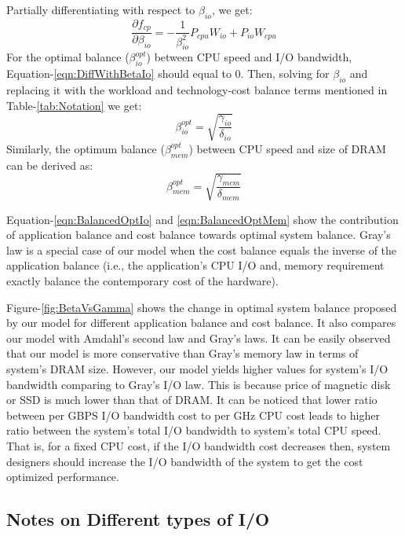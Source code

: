 \documentclass[journal]{IEEEtran}
\begin{document}
Partially differentiating with respect to $\beta_{io}$, we get:
\begin{equation} \label{eqn:DiffWithBetaIo}
\frac{\partial f_{cp}}{\partial \beta_{io}} = -\frac{1}{\beta_{io}^2}P_{cpu}W_{io} + P_{io}W_{cpu}
\end{equation}
For the optimal balance ($\beta_{io}^{opt}$) between CPU speed and I/O bandwidth, Equation-\ref{eqn:DiffWithBetaIo} should equal to $0$. Then,  solving for $\beta_{io}$ and replacing it with the workload and technology-cost balance terms mentioned in Table-\ref{tab:Notation} we get:
\begin{equation} \label{eqn:BalancedOptIo}
\beta^{opt}_{io} = \sqrt{\frac{\gamma_{io}}{\delta_{io}}}
\end{equation}
Similarly, the optimum balance ($\beta_{mem}^{opt}$) between CPU speed and size of DRAM can be derived as: 
\begin{equation} \label{eqn:BalancedOptMem}
\beta^{opt}_{mem} = \sqrt{\frac{\gamma_{mem}}{\delta_{mem}}}
\end{equation}

Equation-\ref{eqn:BalancedOptIo} and \ref{eqn:BalancedOptMem} show the contribution of application balance and cost balance towards  optimal system balance. Gray's law is a special case of our model when the cost balance equals the inverse of the application balance (i.e., the application's CPU  I/O and, memory requirement exactly balance the contemporary cost of the hardware).

Figure-\ref{fig:BetaVsGamma} shows the change in optimal system balance proposed by our model for different application balance and cost balance. It also compares our model with Amdahl's second law and Gray's laws. It can be easily observed that our model is more conservative than Gray's memory law in terms of system's DRAM size. However, our model yields higher values for system's I/O bandwidth comparing to Gray's I/O law. This is because price of magnetic disk or SSD is much lower than that of DRAM. It can be noticed that lower  ratio between per GBPS I/O bandwidth cost to per GHz CPU cost  leads to higher ratio between the system's total I/O bandwidth to system's total CPU speed. That is, for a fixed CPU cost, if the I/O bandwidth cost decreases then, system designers should increase the I/O bandwidth of the system to get the cost optimized performance.   

\subsection{Notes on Different types of I/O}
\end{document}
